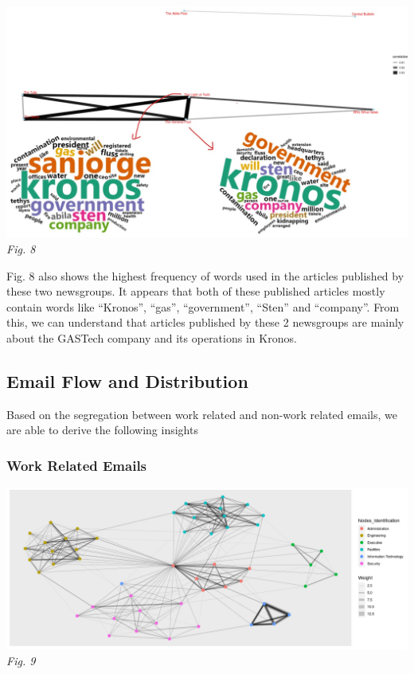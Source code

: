 \documentclass{acm_proc_article-sp}
\begin{document}
\includegraphics{img/image16.jpg} \emph{Fig. 8}

Fig. 8 also shows the highest frequency of words used in the articles
published by these two newsgroups. It appears that both of these
published articles mostly contain words like ``Kronos'', ``gas'',
``government'', ``Sten'' and ``company''. From this, we can understand
that articles published by these 2 newsgroups are mainly about the
GASTech company and its operations in Kronos.

\hypertarget{email-flow-and-distribution}{%
\subsection{Email Flow and
Distribution}\label{email-flow-and-distribution}}

Based on the segregation between work related and non-work related
emails, we are able to derive the following insights

\hypertarget{work-related-emails}{%
\subsubsection{Work Related Emails}\label{work-related-emails}}

\includegraphics{img/image14.png} \emph{Fig. 9}
\end{document}
